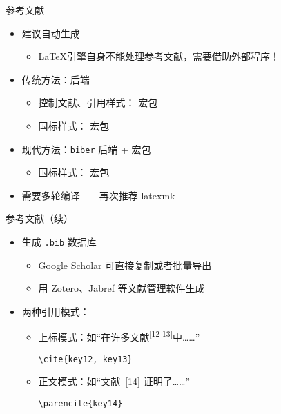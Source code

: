 \begin{frame}[fragile]{参考文献}
  \begin{itemize}
    \item 建议自动生成
          \begin{itemize}
            \item \LaTeX 引擎自身不能处理参考文献，需要借助外部程序！
          \end{itemize}
    \item 传统方法：\BibTeX 后端
          \begin{itemize}
            \item 控制文献、引用样式： 宏包
            \item 国标样式： 宏包
          \end{itemize}
    \item 现代方法：\verb|biber| 后端 +  宏包
          \begin{itemize}
            \item 国标样式： 宏包
          \end{itemize}
    \item 需要多轮编译——再次推荐 latexmk
  \end{itemize}
\end{frame}

\begin{frame}[fragile]{参考文献（续）}
  \begin{itemize}
    \item 生成 \verb|.bib| 数据库
          \begin{itemize}
            \item Google Scholar 可直接复制或者批量导出
            \item 用 Zotero、Jabref 等文献管理软件生成
          \end{itemize}
    \item 两种引用模式：
          \begin{itemize}
            \item 上标模式：如“在许多文献\textsuperscript{[12-13]}中……”
                  \begin{lstlisting}[basicstyle=\ttfamily]
    \cite{key12, key13}
          \end{lstlisting}
            \item 正文模式：如“文献~[14] 证明了……”
                  \begin{lstlisting}[basicstyle=\ttfamily]
    \parencite{key14}
          \end{lstlisting}
          \end{itemize}
  \end{itemize}
\end{frame}

